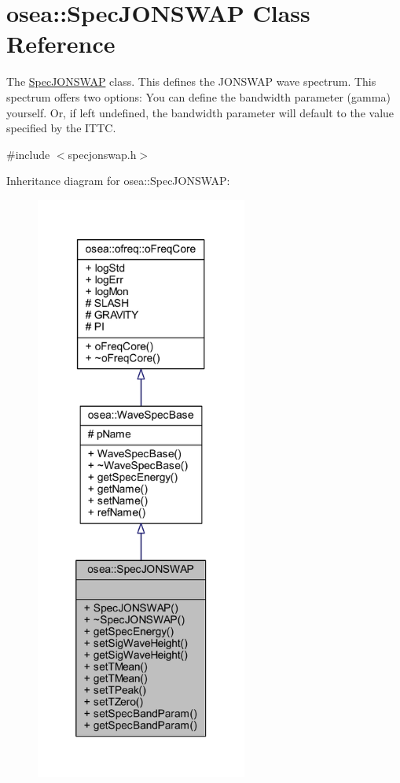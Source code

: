 \hypertarget{classosea_1_1_spec_j_o_n_s_w_a_p}{\section{osea\-:\-:Spec\-J\-O\-N\-S\-W\-A\-P Class Reference}
\label{classosea_1_1_spec_j_o_n_s_w_a_p}
}


The \hyperlink{classosea_1_1_spec_j_o_n_s_w_a_p}{Spec\-J\-O\-N\-S\-W\-A\-P} class. This defines the J\-O\-N\-S\-W\-A\-P wave spectrum. This spectrum offers two options\-: You can define the bandwidth parameter (gamma) yourself. Or, if left undefined, the bandwidth parameter will default to the value specified by the I\-T\-T\-C.  




{\ttfamily \#include $<$specjonswap.\-h$>$}



Inheritance diagram for osea\-:\-:Spec\-J\-O\-N\-S\-W\-A\-P\-:
\nopagebreak
\begin{figure}[H]
\begin{center}
\leavevmode
\includegraphics[height=550pt]{classosea_1_1_spec_j_o_n_s_w_a_p__inherit__graph}
\end{center}
\end{figure}

